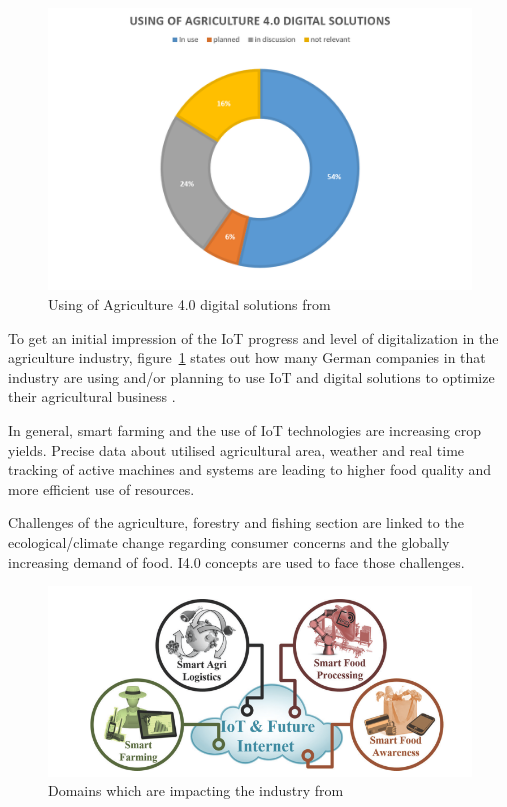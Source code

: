 \begin{figure}
\centering
\includegraphics[width=1\columnwidth]{images/usingOfAgriculure4-0-solutions_pieChart}
\caption{Using of Agriculture 4.0 digital solutions from \citeauthor{digitAgrad} \cite{digitAgrad}}
\label{fig:Agri4.0}
\end{figure}


To get an initial impression of the \ac{IoT} progress and level of digitalization in the agriculture industry, figure~\ref{fig:Agri4.0} states out how many German companies in that industry are using and/or planning to use \ac{IoT} and digital solutions to optimize their agricultural business \cite{digitAgrad}.

In general, smart farming and the use of \ac{IoT} technologies are increasing crop yields. Precise data about utilised agricultural area, weather and real time tracking of active machines and systems are leading to higher food quality and more efficient use of resources.

Challenges of the agriculture, forestry and fishing section are linked to the ecological/climate change regarding consumer concerns and the globally increasing demand of food. \ac{I4.0} concepts are used to face those challenges.


\begin{figure}
\centering
\includegraphics[width=1\columnwidth]{images/digitising-industry_agriculture_smartFarming}
\caption{Domains which are impacting the industry from \citeauthor[p.133]{FoodAndFarm2020} \cite[p.133]{FoodAndFarm2020}}
\label{fig:AgriDomains}
\end{figure}


